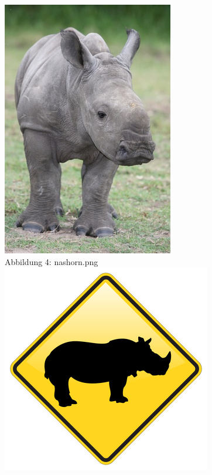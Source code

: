 \includegraphics[scale=0.6]{bilder/nasohnehorn.png }\\
Abbildung 4: nashorn.png\\
\includegraphics[scale=0.6]{bilder/nashorn.png }\\
